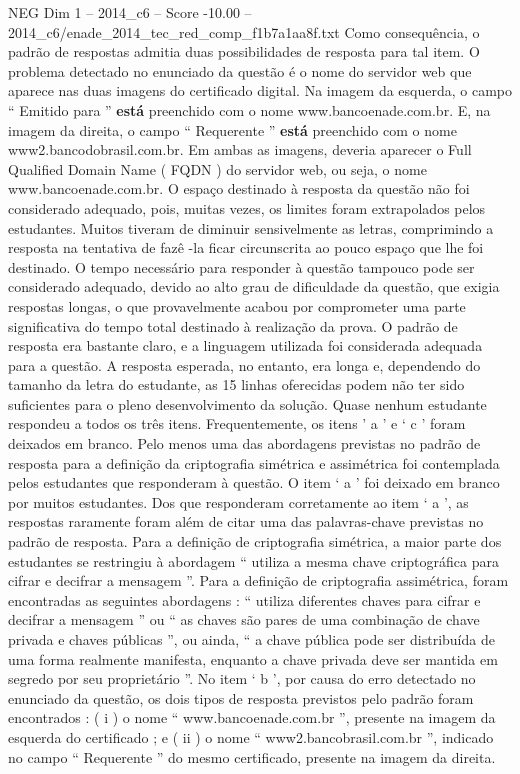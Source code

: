 \begin{textsample}{NEG Dim 1 – 2014\_c6 – Score -10.00 – 2014\_c6/enade\_2014\_tec\_red\_comp\_f1b7a1aa8f.txt}
Como consequência, o padrão de respostas admitia duas possibilidades de resposta para tal item.
O problema detectado no enunciado da questão é o nome do servidor web que aparece nas duas imagens do certificado digital.
Na imagem da esquerda, o campo “ Emitido para ” \textbf{está} preenchido com o nome www.bancoenade.com.br.
E, na imagem da direita, o campo “ Requerente ” \textbf{está} preenchido com o nome www2.bancodobrasil.com.br.
Em ambas as imagens, deveria aparecer o Full Qualified Domain Name ( FQDN ) do servidor web, ou seja, o nome www.bancoenade.com.br.
O espaço destinado à resposta da questão não foi considerado adequado, pois, muitas vezes, os limites foram extrapolados pelos estudantes.
Muitos tiveram de diminuir sensivelmente as letras, comprimindo a resposta na tentativa de fazê -la ficar circunscrita ao pouco espaço que lhe foi destinado.
O tempo necessário para responder à questão tampouco pode ser considerado adequado, devido ao alto grau de dificuldade da questão, que exigia respostas longas, o que provavelmente acabou por comprometer uma parte significativa do tempo total destinado à realização da prova.
O padrão de resposta era bastante claro, e a linguagem utilizada foi considerada adequada para a questão.
A resposta esperada, no entanto, era longa e, dependendo do tamanho da letra do estudante, as 15 linhas oferecidas podem não ter sido suficientes para o pleno desenvolvimento da solução.
Quase nenhum estudante respondeu a todos os três itens.
Frequentemente, os itens ’ a ’ e ‘ c ’ foram deixados em branco.
Pelo menos uma das abordagens previstas no padrão de resposta para a definição da criptografia simétrica e assimétrica foi contemplada pelos estudantes que responderam à questão.
O item ‘ a ’ foi deixado em branco por muitos estudantes.
Dos que responderam corretamente ao item ‘ a ’, as respostas raramente foram além de citar uma das palavras-chave previstas no padrão de resposta.
Para a definição de criptografia simétrica, a maior parte dos estudantes se restringiu à abordagem “ utiliza a mesma chave criptográfica para cifrar e decifrar a mensagem ”.
Para a definição de criptografia assimétrica, foram encontradas as seguintes abordagens : “ utiliza diferentes chaves para cifrar e decifrar a mensagem ” ou “ as chaves são pares de uma combinação de chave privada e chaves públicas ”, ou ainda, “ a chave pública pode ser distribuída de uma forma realmente manifesta, enquanto a chave privada deve ser mantida em segredo por seu proprietário ”.
No item ‘ b ’, por causa do erro detectado no enunciado da questão, os dois tipos de resposta previstos pelo padrão foram encontrados : ( i ) o nome “ www.bancoenade.com.br ”, presente na imagem da esquerda do certificado ; e ( ii ) o nome “ www2.bancobrasil.com.br ”, indicado no campo “ Requerente ” do mesmo certificado, presente na imagem da direita.

\end{textsample}
